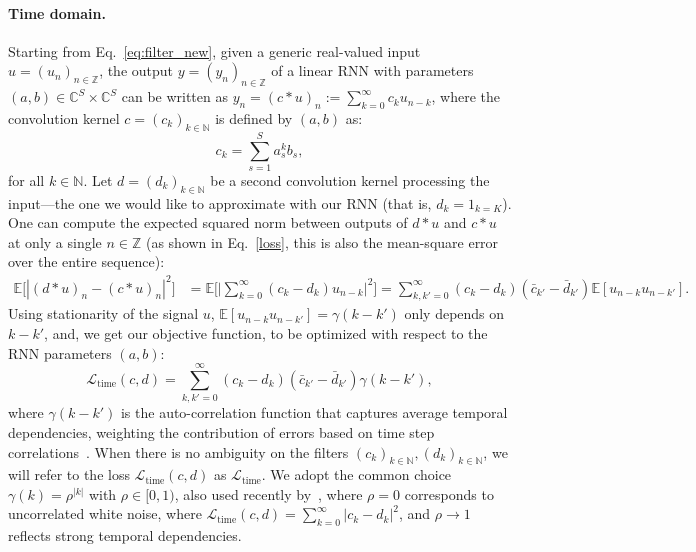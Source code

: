 \paragraph{Time domain.} Starting from Eq.~\eqref{eq:filter_new}, given a generic real-valued input $u=(u_n)_{n\in\mathbb{Z}}$, the output $y=(y_n)_{n\in\mathbb{Z}}$ of a linear RNN with parameters $(a,b) \in \mathbb{C}^S \times \mathbb{C}^S$ can be written as 
$y_n = (c\ast u)_n:= \sum_{k=0}^\infty c_k u_{n-k}$, where the convolution kernel $c = (c_k)_{k\in\mathbb{N}}$ is defined by $(a,b)$  as: 
\begin{equation}
\label{eq:cab}
c_k = \sum_{s=1}^S a^k_s b_s,
\end{equation}
for all $k\in\mathbb{N}$. Let $d = (d_k)_{k\in\mathbb{N}}$ be a second convolution kernel processing the input---the one we would like to approximate with our RNN (that is, $d_k = 1_{k = K}$). One can compute the expected squared norm between outputs of $d\ast u$ and $c\ast u$ at only a single $n \in \mathbb{Z}$ (as shown in Eq.~\eqref{loss}, this is also the mean-square error over the entire sequence):
\begin{align*}
     \mathbb{E} \Big[ |(d\ast u)_n-(c\ast u)_n|^2  \Big] &=   \mathbb{E} \Big[ \Big|\sum_{k=0}^\infty (c_k -d_{k}) u_{n-k} \Big|^2 \Big] =  \sum_{k,k'=0}^\infty (c_k -d_{k}) (\bar{c}_{k'} -\bar{d}_{k'})  \mathbb{E} [ u_{n-k} u_{n-{k'}}].
\end{align*}
Using stationarity of the signal $u$, $\mathbb{E} [ u_{n-k} u_{n-{k'}}] = \gamma(k-k')$ only depends on $k-k'$, and, we get our objective function, to be optimized with respect to the RNN parameters $(a,b)$:
\begin{equation}
    \mathcal{L}_{\text{time}}(c, d) = \sum_{k, k'=0}^{\infty}(c_k - d_k)(\bar{c}_{k'} - \bar{d}_{k'})\gamma(k-k')
    \label{Time domain loss},
\end{equation}
where \(\gamma(k - k')\) is the auto-correlation function that captures average temporal dependencies, weighting the contribution of errors based on time step correlations~\citep{brockwell2002introduction}. When there is no ambiguity on the filters $(c_k)_{k \in \mathbb{N}}, (d_k)_{k \in \mathbb{N}}$, we will refer to the loss $\mathcal{L}_\text{time}(c, d)$ as $\mathcal{L}_\text{time}$. We adopt the common choice \(\gamma(k) = \rho^{|k|}\) with \(\rho \in [0,1)\), also used recently by~\citet{zucchet2024recurrent}, where \(\rho = 0\) corresponds to uncorrelated white noise, 
where 
$\mathcal{L}_{\text{time}}(c, d) = \sum_{k =0}^{\infty}|c_k - d_k|^2$,
and \(\rho \to 1\) reflects strong temporal dependencies.

